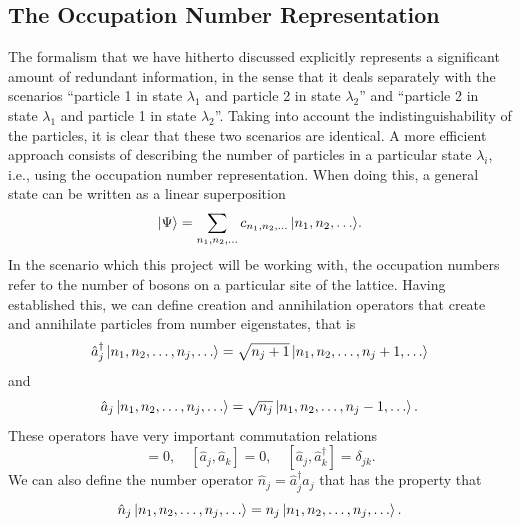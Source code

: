 \documentclass[a4paper, 10pt]{article}
\theoremstyle{plain}
\begin{document}
\subsection{The Occupation Number Representation}

The formalism that we have hitherto discussed explicitly represents a
significant amount of redundant information, in the sense that it deals
separately with the scenarios ``particle 1 in state $\lambda_1$ and particle 2
in state $\lambda_{2}$'' and ``particle 2 in state $\lambda_1$ and particle 1 in
state $\lambda_{2}$''. Taking into account the indistinguishability of the
particles, it is clear that these two scenarios are identical. A more efficient
approach consists of describing the number of particles in a particular state
$\lambda_i$, i.e., using the occupation number representation. When doing this,
a general state can be written as a linear superposition
\begin{equation}
    \ket{\Psi}
    =
    \sum_{n_{1}, n_{2}, \dots}%
        {c_{n_{1}, n_{2}, \dots}\ket{n_{1}, n_{2}, \dots}}.
\end{equation}
In the scenario which this project will be working with, the occupation numbers
refer to the number of bosons on a particular site of the lattice. Having
established this, we can define creation and annihilation operators that create
and annihilate particles from number eigenstates, that is
\begin{equation}
    \hat{a}_{j}^{\dagger} \ket{n_{1}, n_{2}, \dots, n_{j}, \dots}
    =
    \sqrt{n_{j} + 1} \ket{n_{1}, n_{2}, \dots, n_{j}+1, \dots}
\end{equation}
and
\begin{equation}
    \hat{a}_{j} \ket{n_{1}, n_{2}, \dots, n_{j}, \dots}
    =
    \sqrt{n_{j}} \ket{n_{1}, n_{2}, \dots, n_{j}-1, \dots}.
\end{equation}
These operators have very important commutation relations
\begin{equation}
    [ \hat{a}_{j}^{\dagger}, \hat{a}_{k}^{\dagger}] = 0, \quad
    [ \hat{a}_{j}, \hat{a}_{k}]=0, \quad
    [\hat{a}_{j},\hat{a}_{k}^{\dagger}]=\delta_{jk}.
\end{equation}
We can also define the number operator $\hat{n}_{j} = \hat{a}_{j}^{\dagger}
\hat{a}_{j}$ that has the property that
\begin{equation}
    \hat{n}_{j} \ket{n_{1}, n_{2}, \dots, n_{j}, \dots}
    =
    n_{j} \ket{n_{1}, n_{2}, \dots, n_{j}, \dots}.
\end{equation}
\end{document}

